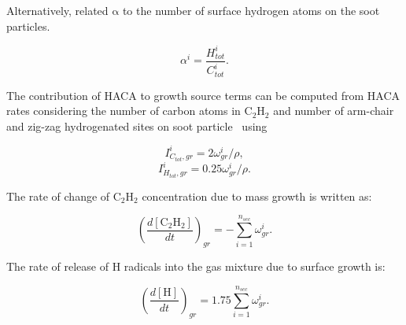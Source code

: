 Alternatively, \citet{blanquart2009joint} related $\mathrm{\alpha}$ to the number of surface hydrogen atoms on the soot particles.

\begin{equation}
	\alpha^i = \frac{H^i_{tot}}{C^i_{tot}}
	\label{eqn:alpha_htoc}.
\end{equation}

The contribution of HACA to growth source terms can be computed from HACA rates considering the number of carbon atoms in $\mathrm{C_2H_2}$ and number of arm-chair and zig-zag hydrogenated sites on soot particle~\cite{blanquart2009analyzing} using

\begin{equation}
	I^i_{C_{tot},gr} = 2\omega^i_{gr}/\rho
	\label{eqn:IiCtotgr},
\end{equation}
\begin{equation}
	I^i_{H_{tot},gr} = 0.25\omega^i_{gr}/\rho
	\label{eqn:IiHtotgr}.
\end{equation}

The rate of change of $\mathrm{C_2H_2}$ concentration due to mass growth is written as:

\begin{equation}
	\left(\frac{d\left[{\mathrm{C_2H_2}}\right]}{dt}\right)_{gr} = -\sum_{i=1}^{n_{sec}}\omega^i_{gr}
	\label{eqn:C2H2rate_gr}.
\end{equation}

The rate of release of H radicals into the gas mixture due to surface growth is:

\begin{equation}
	\left(\frac{d\left[{\mathrm{H}}\right]}{dt}\right)_{gr} = 1.75 \sum_{i=1}^{n_{sec}}\omega^i_{gr}
	\label{eqn:Hrate_gr}.
\end{equation}





